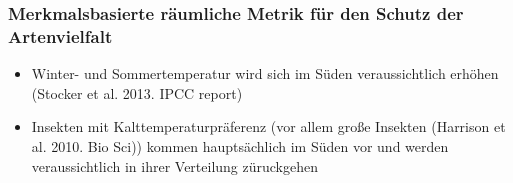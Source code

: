 \documentclass{beamer}
\begin{document}

\begin{frame}
  \frametitle {Merkmalsbasierte räumliche Metrik für den Schutz der Artenvielfalt}
 \begin{itemize}
  \item \alert{Winter- und Sommertemperatur wird sich im Süden veraussichtlich erhöhen} \footnotesize{(Stocker et al. 2013. IPCC report)}\normalsize
  \pause
  \item\alert{Insekten mit Kalttemperaturpräferenz} (vor allem große Insekten \footnotesize{(Harrison et al. 2010. Bio Sci)}) \normalsize kommen hauptsächlich im Süden vor und \normalsize \alert{werden veraussichtlich in ihrer Verteilung züruckgehen}
  \end{itemize}
  \end{frame}

\end{document}
